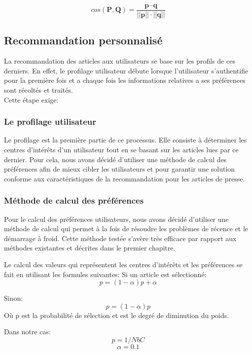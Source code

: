             \[cos(\pmb P, \pmb Q) = \frac {\pmb p \cdot \pmb q}{||\pmb p|| \cdot ||\pmb q||}\]


\subsection{Recommandation personnalisé}
La recommandation des articles aux utilisateurs se base sur les profils de ces derniers. En effet, le profilage utilisateur débute lorsque l'utilisateur s'authentifie pour la première fois et a chaque fois les informations relatives a ses préférences sont récoltés et traités.\\
Cette étape exige:

\subsubsection{Le profilage utilisateur}
Le profilage est la première partie de ce processus. Elle consiste à déterminer les centres d'intérêts d'un utilisateur tout en se basant sur les articles lues par ce dernier. Pour cela, nous avons décidé d'utiliser une méthode de calcul des préférences afin de mieux cibler les utilisateurs et pour garantir une solution conforme aux caractéristiques de la recommandation pour les articles de presse.

\subsubsection{Méthode de calcul des préférences}
Pour le calcul des préférences utilisateurs, nous avons décidé d'utiliser une méthode de calcul qui permet à la fois de résoudre les problèmes de récence et le démarrage à froid. Cette méthode testée s'avère très efficace par rapport aux méthodes existantes et décrites dans le premier chapitre.

Le calcul des valeurs qui représentent les centres d’intérêts et les préférences se fait en utilisant les formules suivantes: \label{proba-select}
    Si un article est sélectionné:
                                   \[p = (1-{\alpha}) {p} + {\alpha}\]

    Sinon: 
                                     \[{p} = (1-{\alpha}) {p}\]
Où p est la probabilité de sélection et \alpha  est le degré de diminution du poids.

Dans notre cas:
                                   \[p = 1/{NbC}\]
                                   \[\alpha = 0.1\]

